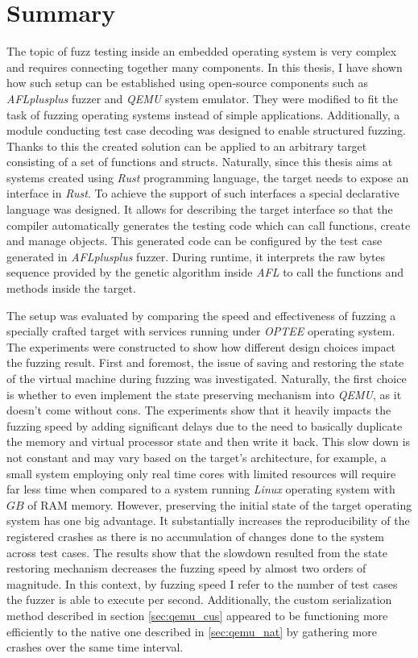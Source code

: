 \cleardoublepage
\section{Summary} \label{chap:summ}
The topic of fuzz testing inside an embedded operating system is very complex and requires connecting together many components. In this thesis, I have shown how such setup can be established using open-source components such as \textit{AFLplusplus} fuzzer and \textit{QEMU} system emulator. They were modified to fit the task of fuzzing operating systems instead of simple applications. Additionally, a module conducting test case decoding was designed to enable structured fuzzing. Thanks to this the created solution can be applied to an arbitrary target consisting of a set of functions and structs. Naturally, since this thesis aims at systems created using \textit{Rust} programming language, the target needs to expose an interface in \textit{Rust}. To achieve the support of such interfaces a special declarative language was designed. It allows for describing the target interface so that the compiler automatically generates the testing code which can call functions, create and manage objects. This generated code can be configured by the test case generated in \textit{AFLplusplus} fuzzer. During runtime, it interprets the raw bytes sequence provided by the genetic algorithm inside \textit{AFL} to call the functions and methods inside the target.

The setup was evaluated by comparing the speed and effectiveness of fuzzing a specially crafted target with services running under \textit{OPTEE} operating system. The experiments were constructed to show how different design choices impact the fuzzing result. First and foremost, the issue of saving and restoring the state of the virtual machine during fuzzing was investigated. Naturally, the first choice is whether to even implement the state preserving mechanism into \textit{QEMU}, as it doesn't come without cons. The experiments show that it heavily impacts the fuzzing speed by adding significant delays due to the need to basically duplicate the memory and virtual processor state and then write it back. This slow down is not constant and may vary based on the target's architecture, for example, a small system employing only real time cores with limited resources will require far less time when compared to a system running \textit{Linux} operating system with $GB$ of RAM memory. However, preserving the initial state of the target operating system has one big advantage. It substantially increases the reproducibility of the registered crashes as there is no accumulation of changes done to the system across test cases. The results show that the slowdown resulted from the state restoring mechanism decreases the fuzzing speed by almost two orders of magnitude. In this context, by fuzzing speed I refer to the number of test cases the fuzzer is able to execute per second. Additionally, the custom serialization method described in section \ref{sec:qemu_cus} appeared to be functioning more efficiently to the native one described in \ref{sec:qemu_nat} by gathering more crashes over the same time interval.

